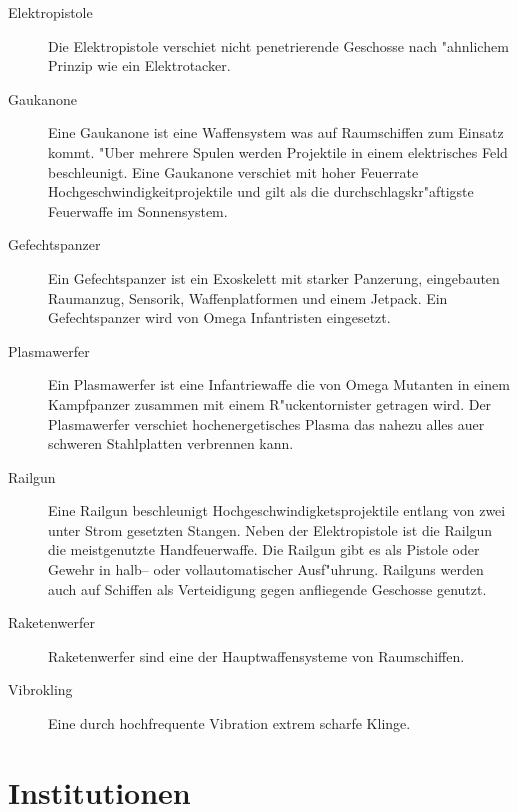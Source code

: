 \begin{appendices}
\begin{description}
\item [Elektropistole] Die Elektropistole verschie\3t nicht penetrierende Geschosse nach "ahnlichem Prinzip wie ein
      Elektrotacker.
\item [Gau\3kanone] Eine Gau\3kanone ist eine Waffensystem was auf Raumschiffen zum Einsatz kommt. "Uber mehrere Spulen
      werden Projektile in einem elektrisches Feld beschleunigt. Eine Gau\3kanone verschie\3t mit hoher Feuerrate Hochgeschwindigkeitprojektile und gilt als die durchschlagskr"aftigste Feuerwaffe im Sonnensystem.
\item [Gefechtspanzer] Ein Gefechtspanzer ist ein Exoskelett mit starker Panzerung, eingebauten Raumanzug, Sensorik,
      Waffenplatformen und einem Jetpack. Ein Gefechtspanzer wird von Omega Infantristen eingesetzt.
\item [Plasmawerfer] Ein Plasmawerfer ist eine Infantriewaffe die von Omega Mutanten in einem Kampfpanzer zusammen mit
      einem R"uckentornister getragen wird. Der Plasmawerfer verschie\3t hochenergetisches Plasma das nahezu alles au\3er schweren Stahlplatten verbrennen kann.
\item [Railgun] Eine Railgun beschleunigt Hochgeschwindigketsprojektile entlang von zwei unter Strom gesetzten Stangen.
      Neben der Elektropistole ist die Railgun die meistgenutzte Handfeuerwaffe. Die Railgun gibt es als Pistole oder Gewehr in halb-- oder vollautomatischer Ausf"uhrung. Railguns werden auch auf Schiffen als Verteidigung gegen anfliegende Geschosse genutzt.
\item [Raketenwerfer] Raketenwerfer sind eine der Hauptwaffensysteme von Raumschiffen.
\item [Vibrokling] Eine durch hochfrequente Vibration extrem scharfe Klinge.
\end{description}

\section{Institutionen}


\end{appendices}
